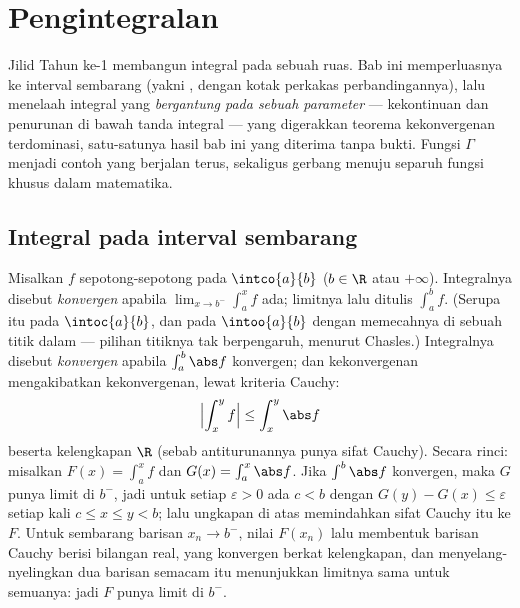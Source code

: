 \chapter{Pengintegralan}\label{ch:b2:integration}

Jilid Tahun ke-1 membangun integral pada sebuah ruas. Bab ini
memperluasnya ke interval sembarang (yakni , 
dengan kotak perkakas perbandingannya), lalu menelaah integral yang
\emph{bergantung pada sebuah parameter} --- kekontinuan dan penurunan di
bawah tanda integral --- yang digerakkan teorema kekonvergenan
terdominasi, satu-satunya hasil bab ini yang diterima tanpa bukti. Fungsi
$\Gamma$ menjadi contoh yang berjalan terus, sekaligus gerbang menuju
separuh fungsi khusus dalam matematika.

\section{Integral pada interval sembarang}

\begin{definition}\label{def:b2:integration:improper}
Misalkan $f$  sepotong-sepotong pada $\intco{a}{b}$ ($b \in \R$
atau $+\infty$). Integralnya disebut
\emph{konvergen} apabila $\lim_{x \to b^-}
\int_a^x f$ ada; limitnya lalu ditulis $\int_a^b f$. (Serupa itu pada
$\intoc{a}{b}$, dan pada $\intoo{a}{b}$ dengan memecahnya di sebuah titik
dalam --- pilihan titiknya tak berpengaruh, menurut Chasles.) Integralnya
disebut \emph{konvergen } apabila $\int_a^b \abs f$ konvergen;
dan kekonvergenan  mengakibatkan kekonvergenan, lewat kriteria Cauchy:
\[
\Bigl| \int_x^{y} f \Bigr| \leq \int_x^{y} \abs f
\]
beserta kelengkapan $\R$ (sebab antiturunannya punya sifat Cauchy).
Secara rinci: misalkan $F(x) = \int_a^x f$ dan $G(x) = \int_a^x \abs
f$. Jika $\int^b\abs f$ konvergen, maka $G$ punya limit di $b^-$, jadi
untuk setiap $\varepsilon > 0$ ada $c < b$ dengan $G(y) - G(x)
\leq \varepsilon$ setiap kali $c \leq x \leq y < b$; lalu ungkapan di
atas memindahkan sifat Cauchy itu ke $F$. Untuk sembarang barisan $x_n
\to b^-$, nilai $F(x_n)$ lalu membentuk barisan Cauchy berisi bilangan
real, yang konvergen berkat kelengkapan, dan menyelang-nyelingkan dua
barisan semacam itu menunjukkan limitnya sama untuk semuanya: jadi $F$
punya limit di $b^-$.
\end{definition}

